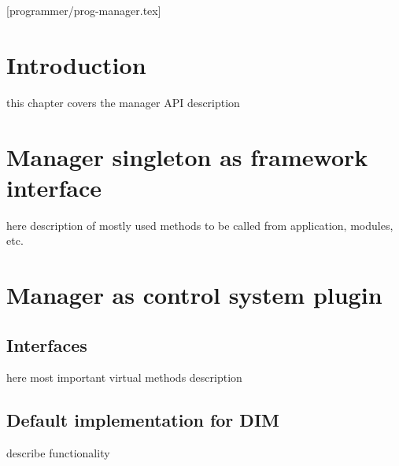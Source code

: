 [programmer/prog-manager.tex]

\section{Introduction}
this chapter covers the manager API description


\section{Manager singleton as framework interface}
here description of mostly used methods to be called from application, modules, etc.


\section{Manager as control system plugin}

\subsection{Interfaces}
here most important virtual methods description


\subsection{Default implementation for DIM}
describe functionality 
